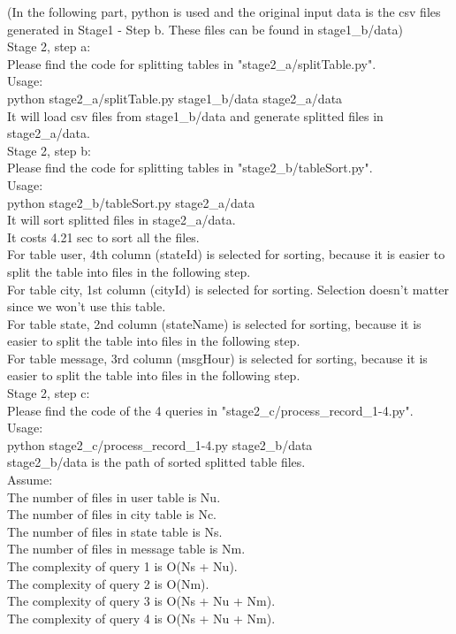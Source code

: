 \documentclass[a4paper]{article}
\begin{document}
(In the following part, python is used and the original input data is the csv files generated in Stage1 - Step b. These files can be found in stage1\_b/data)\\

Stage 2, step a:\\
Please find the code for splitting tables in "stage2\_a/splitTable.py".\\
Usage: \\
python stage2\_a/splitTable.py stage1\_b/data stage2\_a/data\\
It will load csv files from stage1\_b/data and generate splitted files in stage2\_a/data.\\

Stage 2, step b:\\
Please find the code for splitting tables in "stage2\_b/tableSort.py".\\
Usage: \\
python stage2\_b/tableSort.py stage2\_a/data\\
It will sort splitted files in stage2\_a/data.\\

It costs 4.21 sec to sort all the files.\\
For table user, 4th column (stateId) is selected for sorting, because it is easier to split the table into files in the following step.\\
For table city, 1st column (cityId) is selected for sorting. Selection doesn't matter since we won't use this table.\\
For table state, 2nd column (stateName) is selected for sorting, because it is easier to split the table into files in the following step.\\
For table message, 3rd column (msgHour) is selected for sorting, because it is easier to split the table into files in the following step.\\

Stage 2, step c:\\
Please find the code of the 4 queries in "stage2\_c/process\_record\_1-4.py".\\
Usage:\\
python stage2\_c/process\_record\_1-4.py stage2\_b/data\\
stage2\_b/data is the path of sorted splitted table files.\\

Assume: \\
The number of files in user table is Nu.\\ 
The number of files in city table is Nc.\\ 
The number of files in state table is Ns.\\ 
The number of files in message table is Nm.\\ 
The complexity of query 1 is O(Ns + Nu).\\
The complexity of query 2 is O(Nm).\\
The complexity of query 3 is O(Ns + Nu + Nm).\\
The complexity of query 4 is O(Ns + Nu + Nm).\\
\end{document}

